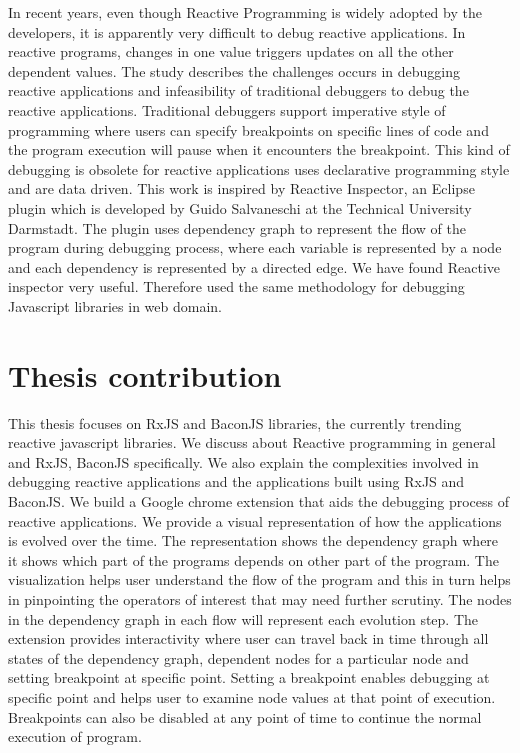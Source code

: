 In recent years, even though Reactive Programming is widely adopted by the developers, it is apparently very difficult to debug reactive applications. 
In reactive programs, changes in one value triggers updates on all the other dependent values. The study\cite{Salvaneschi:2016:DRP:2889160.2893174} describes the challenges occurs in debugging reactive applications and infeasibility of traditional debuggers to debug the reactive applications. Traditional debuggers support imperative style of programming where users can specify breakpoints on specific lines of code and the program execution will pause when it encounters the breakpoint. 
This kind of debugging is obsolete for reactive applications uses declarative programming style and are data driven. 
This work is inspired by Reactive Inspector\cite{reactiveInspector}, an Eclipse plugin which is developed by Guido Salvaneschi at the Technical University Darmstadt. 
The plugin uses dependency graph to represent the flow of the program during debugging process, where each variable is represented by a node and each dependency is represented by a directed edge.
We have found Reactive inspector very useful. Therefore used the same methodology for debugging Javascript libraries in web domain.

\section{Thesis contribution}

This thesis focuses on RxJS and BaconJS libraries, the currently trending reactive javascript libraries. 
We discuss about Reactive programming in general and RxJS, BaconJS specifically.
We also explain the complexities involved in debugging reactive applications and the applications built using RxJS and BaconJS. 
We build a Google chrome extension that aids the debugging process of reactive applications. 
We provide a visual representation of how the applications is evolved over the time. 
The representation shows the dependency graph where it shows which part of the programs depends on other part of the program. 
The visualization helps user understand the flow of the program and this in turn helps in pinpointing the operators of interest that may need further scrutiny. 
The nodes in the dependency graph in each flow will represent each evolution step. 
The extension provides interactivity where user can travel back in time through all states of the dependency graph, dependent nodes for a particular node and setting breakpoint at specific point. 
Setting a breakpoint enables debugging at specific point and helps user to examine node values at that point of execution. 
Breakpoints can also be disabled at any point of time to continue the normal execution of program.


